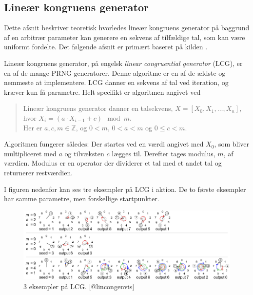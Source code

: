 \documentclass[
]{book}
\theoremstyle{definition}
\theoremstyle{definition}
\theoremstyle{definition}
\theoremstyle{remark}
\let\BeginKnitrBlock\begin \let\EndKnitrBlock\end
\begin{document}
\hypertarget{lineuxe6r-kongruens-generator}{%
\subsection{Lineær kongruens generator}\label{lineuxe6r-kongruens-generator}}

Dette afsnit beskriver teoretisk hvorledes lineær kongruens generator på baggrund af en arbitrær parameter kan generere en sekvens af tilfældige tal, som kan være uniformt fordelte. Det følgende afsnit er primært baseret på kilden \citep{LCGinfo}.

Lineær kongruens generator, på engelsk \emph{linear congruential generator} (LCG), er en af de mange PRNG generatorer. Denne algoritme er en af de ældste og nemmeste at implementere. LCG danner en sekvens af tal ved iteration, og kræver kun få parametre. Helt specifikt er algoritmen angivet ved

\begin{quote}
\BeginKnitrBlock{definition}
\protect\hypertarget{def:unnamed-chunk-2}{}{\label{def:unnamed-chunk-2} } Lineær kongruens generator danner en talsekvens, \(X = [X_0, X_1, \ldots, X_n]\), hvor \(X_{i} = (a \cdot X_{i-1} + c) \mod m\).\\
Her er \(a, c, m \in \mathbb{Z}\), og \(0 < m\), \(0 < a < m\) og \(0 \leq c < m\).
\EndKnitrBlock{definition}
\end{quote}

Algoritmen fungerer således:
Der startes ved en værdi angivet med \(X_0\), som bliver multipliceret med \(a\) og tilvæksten \(c\) lægges til. Derefter tages modulus, \(m\), af værdien. Modulus er en operator der dividerer et tal med et andet tal og returnerer restværdien.

I figuren nedenfor kan ses tre eksempler på LCG i aktion. De to første eksempler har samme parametre, men forskellige startpunkter.

\begin{figure}

{\centering \includegraphics[width=0.75\linewidth]{images/LCG_eksempel} 

}

\caption{ 3 eksempler på LCG. [@lincongenvis]}\label{fig:unnamed-chunk-3}
\end{figure}
\end{document}

